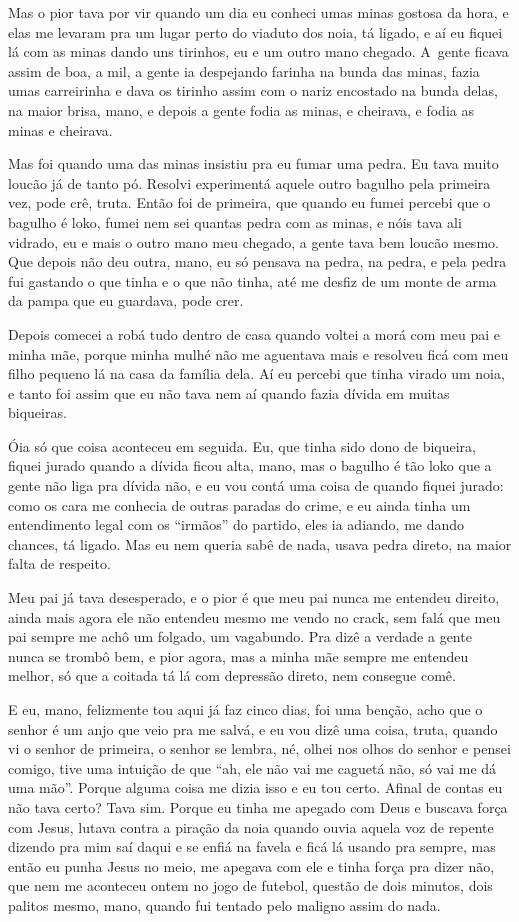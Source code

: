 Mas o pior tava por vir quando um dia eu conheci umas minas gostosa da
hora, e elas me levaram pra um lugar perto do viaduto dos noia, tá
ligado, e aí eu fiquei lá com as minas dando uns tirinhos, eu e um outro
mano chegado. A~gente ficava assim de boa, a mil, a gente ia despejando
farinha na bunda das minas, fazia umas carreirinha e dava os tirinho
assim com o nariz encostado na bunda delas, na maior brisa, mano, e
depois a gente fodia as minas, e cheirava, e fodia as minas e cheirava.

Mas foi quando uma das minas insistiu pra eu fumar uma pedra. Eu tava
muito loucão já de tanto pó. Resolvi experimentá aquele outro bagulho
pela primeira vez, pode crê, truta. Então foi de primeira, que quando eu
fumei percebi que o bagulho é loko, fumei nem sei quantas pedra com as
minas, e nóis tava ali vidrado, eu e mais o outro mano meu chegado, a
gente tava bem loucão mesmo. Que depois não deu outra, mano, eu só
pensava na pedra, na pedra, e pela pedra fui gastando o que tinha e o
que não tinha, até me desfiz de um monte de arma da pampa que eu
guardava, pode crer.

Depois comecei a robá tudo dentro de casa quando voltei a morá com meu
pai e minha mãe, porque minha mulhé não me aguentava mais e resolveu
ficá com meu filho pequeno lá na casa da família dela. Aí eu percebi que
tinha virado um noia, e tanto foi assim que eu não tava nem aí quando
fazia dívida em muitas biqueiras.

Óia só que coisa aconteceu em seguida. Eu, que tinha sido dono de
biqueira, fiquei jurado quando a dívida ficou alta, mano, mas o bagulho
é tão loko que a gente não liga pra dívida não, e eu vou contá uma coisa
de quando fiquei jurado: como os cara me conhecia de outras paradas do
crime, e eu ainda tinha um entendimento legal com os ``irmãos'' do
partido, eles ia adiando, me dando chances, tá ligado. Mas eu nem queria
sabê de nada, usava pedra direto, na maior falta de respeito.

Meu pai já tava desesperado, e o pior é que meu pai nunca me entendeu
direito, ainda mais agora ele não entendeu mesmo me vendo no crack, sem
falá que meu pai sempre me achô um folgado, um vagabundo. Pra dizê a
verdade a gente nunca se trombô bem, e pior agora, mas a minha mãe
sempre me entendeu melhor, só que a coitada tá lá com depressão direto,
nem consegue comê.

E eu, mano, felizmente tou aqui já faz cinco dias, foi uma benção, acho
que o senhor é um anjo que veio pra me salvá, e eu vou dizê uma coisa,
truta, quando vi o senhor de primeira, o senhor se lembra, né, olhei nos
olhos do senhor e pensei comigo, tive uma intuição de que ``ah, ele não
vai me caguetá não, só vai me dá uma mão''. Porque alguma coisa me dizia
isso e eu tou certo. Afinal de contas eu não tava certo? Tava sim.
Porque eu tinha me apegado com Deus e buscava força com Jesus, lutava
contra a piração da noia quando ouvia aquela voz de repente dizendo pra
mim saí daqui e se enfiá na favela e ficá lá usando pra sempre, mas
então eu punha Jesus no meio, me apegava com ele e tinha força pra dizer
não, que nem me aconteceu ontem no jogo de futebol, questão de dois
minutos, dois palitos mesmo, mano, quando fui tentado pelo maligno assim
do nada.

